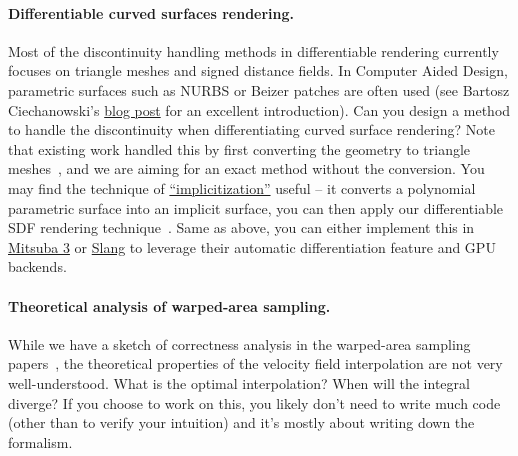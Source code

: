 \paragraph{Differentiable curved surfaces rendering.}
Most of the discontinuity handling methods in differentiable rendering currently focuses on triangle meshes and signed distance fields. In Computer Aided Design, parametric surfaces such as NURBS or Beizer patches are often used (see Bartosz Ciechanowski's \href{https://ciechanow.ski/curves-and-surfaces/}{blog post} for an excellent introduction). Can you design a method to handle the discontinuity when differentiating curved surface rendering? Note that existing work handled this by first converting the geometry to triangle meshes~\cite{Worchel:2023:DRP}, and we are aiming for an exact method without the conversion. You may find the technique of \href{https://web.mit.edu/hyperbook/Patrikalakis-Maekawa-Cho/node68.html}{``implicitization''} useful -- it converts a polynomial parametric surface into an implicit surface, you can then apply our differentiable SDF rendering technique~\cite{Bangaru:2022:DRN}.
Same as above, you can either implement this in \href{https://github.com/mitsuba-renderer/mitsuba3}{Mitsuba 3} or \href{https://developer.nvidia.com/blog/differentiable-slang-example-applications/}{Slang} to leverage their automatic differentiation feature and GPU backends.

\paragraph{Theoretical analysis of warped-area sampling.}
While we have a sketch of correctness analysis in the warped-area sampling papers~\cite{Bangaru:2020:UWS,Bangaru:2022:DRN,Xu:2023:PSDR-WAS}, the theoretical properties of the velocity field interpolation are not very well-understood. What is the optimal interpolation? When will the integral diverge? If you choose to work on this, you likely don't need to write much code (other than to verify your intuition) and it's mostly about writing down the formalism.


